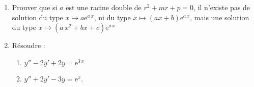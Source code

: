 \documentclass[12pt]{article}
\begin{document}
\begin{enumerate}
\begin{enumerate}
        \item Prouver que si \(a\) est une racine double de \(r^{2}+m r+p=0\), il n'existe pas de solution du type \(x\mapsto a\mathrm{e}^{a\,x}\), ni du type \(x\mapsto (ax+b)\mathrm{e}^{a\,x}\), mais une solution du type \(x\mapsto (a\,x^{2}+bx+c)\mathrm{e}^{a\,x}\)
        \item Résoudre :
        \begin{enumerate}
            \item \(y''-2y'+2y=\mathrm{e}^{3\,x}\)
            \item \(y''+2y'-3y=\mathrm{e}^{x}.\)
        \end{enumerate}
    \end{enumerate}
\end{enumerate}
\end{document}
